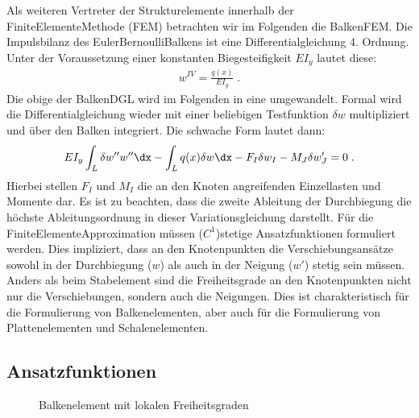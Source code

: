 \documentclass[letterpaper,10pt,german]{jupyterBook}
\let\sphinxpxdimen\pdfpxdimen\else\newdimen\sphinxpxdimen
\begin{document}
\sphinxAtStartPar
Als weiteren Vertreter der Strukturelemente innerhalb der Finite\sphinxhyphen{}Elemente\sphinxhyphen{}Methode (FEM) betrachten wir im Folgenden die Balken\sphinxhyphen{}FEM. Die Impulsbilanz des Euler\sphinxhyphen{}Bernoulli\sphinxhyphen{}Balkens ist eine Differentialgleichung 4. Ordnung. Unter der Voraussetzung einer konstanten Biegesteifigkeit \(EI_y\) lautet diese:
\begin{equation}\label{equation:chapters/chapter2/BalkenFEM:balkendglsimple_2}
\begin{split}  w^{IV} =  \frac{q(x)}{E I_y} \; .\end{split}
\end{equation}
\sphinxAtStartPar
Die obige  der Balken\sphinxhyphen{}DGL wird im Folgenden in eine  umgewandelt. Formal wird die Differentialgleichung wieder mit einer beliebigen Testfunktion \(\delta w\) multipliziert und über den Balken integriert. Die schwache Form lautet dann:
\begin{equation}\label{equation:chapters/chapter2/BalkenFEM:weakBalken_01}
\begin{split}  EI_y \int_L \delta w'' w'' \dx - \int_L q(x) \delta w \dx - F_I \delta w_I - M_J \delta w'_J = 0 \; . \end{split}
\end{equation}
\sphinxAtStartPar
Hierbei stellen \(F_I\) und \(M_I\) die an den Knoten angreifenden Einzellasten und Momente dar. Es ist zu beachten, dass die zweite Ableitung der Durchbiegung die höchste Ableitungsordnung in dieser Variationsgleichung darstellt. Für die Finite\sphinxhyphen{}Elemente\sphinxhyphen{}Approximation müssen (\(C^1\))\sphinxhyphen{}stetige Ansatzfunktionen formuliert werden. Dies impliziert, dass an den Knotenpunkten die Verschiebungsansätze sowohl in der Durchbiegung (\(w\)) als auch in der Neigung (\(w'\)) stetig sein müssen. Anders als beim Stabelement sind die Freiheitsgrade an den Knotenpunkten nicht nur die Verschiebungen, sondern auch die Neigungen. Dies ist charakteristisch für die Formulierung von Balkenelementen, aber auch für die Formulierung von Plattenelementen und Schalenelementen.




\subsection{Ansatzfunktionen}
\label{\detokenize{chapters/chapter2/BalkenFEM:ansatzfunktionen}}
\begin{figure}[htbp]
\centering
\capstart

\noindent\sphinxincludegraphics[height=300\sphinxpxdimen]{{Balkenelement}.png}
\caption{Balkenelement mit lokalen Freiheitsgraden}\label{\detokenize{chapters/chapter2/BalkenFEM:balken03-1}}\end{figure}
\end{document}
